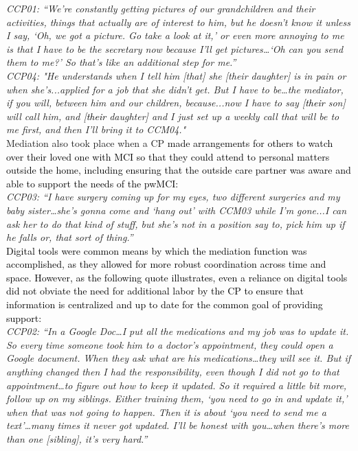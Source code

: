 \documentclass[acmsmall]{acmart}
\begin{document}
\textit{CCP01: “We're constantly getting pictures of our grandchildren and their activities, things that actually are of interest to him, but he doesn't know it unless I say, ‘Oh, we got a picture. Go take a look at it,’ or even more annoying to me is that I have to be the secretary now because I'll get pictures…‘Oh can you send them to me?’ So that's like an additional step for me.”}
\\


\textit{CCP04: "He understands when I tell him [that] she [their daughter] is in pain or when she's...applied for a job that she didn't get. But I have to be…the mediator, if you will, between him and our children, because...now I have to say [\textcolor{black}{their} son] will call him, and [\textcolor{black}{their} daughter] and I just set up a weekly call that will be to me first, and then I'll bring it to CCM04."}
\\


Mediation also took place when a CP \textcolor{black}{made arrangements for others to watch over their loved one with MCI so that they could attend to personal matters outside the home, including ensuring that the outside care partner was aware and able to support the needs of the pwMCI:}
\\

\textit{CCP03: “I have surgery coming up for my eyes, two different surgeries and my baby sister…she's gonna come and ‘hang out’ with CCM03 while I'm gone...I can ask her to do that kind of stuff, but she's not in a position say to, pick him up if he falls or, that sort of thing.”}
\\

\textcolor{black}{Digital tools were common means by which the mediation function was accomplished, as they allowed for more robust coordination across time and space. However, as the following quote illustrates, even a reliance on digital tools did not obviate the need for additional labor \textcolor{black}{by} the CP to ensure that information is centralized and up to date for the common goal of providing support:}
\\

\textit{CCP02: “In a Google Doc…I put all the medications and my job was to update it. So every time someone took him to a doctor's appointment, they could open a Google document. When they ask what are his medications…they will see it. But if anything changed then I had the responsibility, even though I did not go to that appointment…to figure out how to keep it updated. So it required a little bit more, follow up on my siblings. Either training them, ‘you need to go in and update it,’ when that was not going to happen. Then it is about ‘you need to send me a text’…many times it never got updated. I'll be honest with you…when there's more than one [sibling], it's very hard.”}
\\
\end{document}
